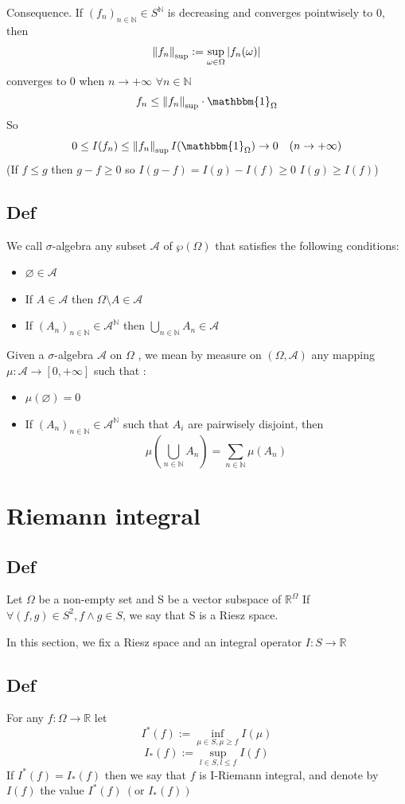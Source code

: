 \documentclass{book}
\newcommand{\abs}[1]{\left\lvert #1 \right\rvert}
\begin{document}
Consequence. If $(f_n)_{n\in \mathbb{N}}\in S^\mathbb{N}$ is decreasing and converges pointwisely to 0, then $$\norm{f_n}_{\sup}:=\sup\limits_{\omega\in \Omega}\abs{f_n(\omega)}$$
converges to 0 when $n\rightarrow+\infty$
$\forall n\in \mathbb{N}$$$f_n\leq\norm{f_n}_{\sup}\cdot\mathbbm{1}_\Omega$$
So $$0\leq I(f_n)\leq\norm{f_n}_{\sup}I(\mathbbm{1}_\Omega)\rightarrow 0\quad(n\rightarrow+\infty)$$
(If $f\leq g$ then $g-f\geq0$ so $I(g-f)=I(g)-I(f)\geq 0$ $I(g)\geq I(f)$)
\section{Def}
We call $\sigma$-algebra any subset $\mathscr{A}$ of $\wp(\Omega)$ that satisfies the following conditions:
\begin{itemize}
    \item $\varnothing\in \mathscr{A}$
    \item If $A\in \mathscr{A}$ then $\Omega\setminus A\in \mathscr{A}$
    \item If $(A_n)_{n\in \mathbb{N}}\in \mathscr{A}^\mathbb{N}$ then $\bigcup\limits_{n\in \mathbb{N}}A_n\in \mathscr{A}$
\end{itemize}
Given a $\sigma$-algebra $\mathscr{A}$ on $\Omega$ , we mean by measure on $(\Omega,\mathscr{A})$ any mapping $\mu:\mathscr{A}\rightarrow[0,+\infty]$ such that :
\begin{itemize}
    \item $\mu(\varnothing)=0$
    \item If $(A_n)_{n\in \mathbb{N}}\in \mathscr{A}^\mathbb{N}$ such that $A_i$ are pairwisely disjoint, then $$\mu(\bigcup\limits_{n\in \mathbb{N}}A_n)=\sum\limits_{n\in\mathbb{N}}\mu(A_n)$$
\end{itemize}
\chapter{Riemann integral}
\section{Def}
Let $\Omega$ be a non-empty set and S be a vector subspace of $\mathbb{R}^\Omega$ If $\forall(f,g)\in S^2,f\wedge g\in S$, we say that S is a Riesz space.

In this section, we fix a Riesz space and an integral operator $I:S\rightarrow\mathbb{R}$
\section{Def}For any $f:\Omega\rightarrow\mathbb{R}$ let 
$$I^*(f):=\inf\limits_{\mu\in S,\mu\geq f}I(\mu)$$
$$I_*(f):=\sup\limits_{l\in S,l\leq f}I(f)$$
If $I^*(f)=I_*(f)$ then we say that $f$ is I-Riemann integral, and denote by $I(f)$ the value $I^*(f)\ (\text{or } I_*(f))$
\end{document}
